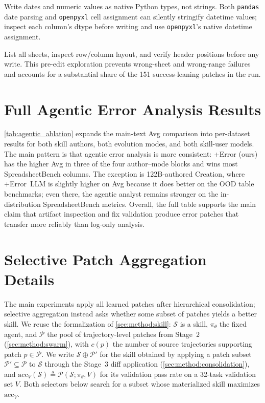 Write dates and numeric values as native Python types, not strings.
Both \texttt{pandas} date parsing and \texttt{openpyxl} cell assignment can silently stringify datetime values; inspect each column's dtype before writing and use \texttt{openpyxl}'s native datetime assignment.

List all sheets, inspect row/column layout, and verify header positions before any write.
This pre-edit exploration prevents wrong-sheet and wrong-range failures and accounts for a substantial share of the 151 success-leaning patches in the run.

\section{Full Agentic Error Analysis Results}
\label{app:agentic_ablation_full}

\cref{tab:agentic_ablation} expands the main-text Avg comparison into per-dataset results for both skill authors, both evolution modes, and both skill-user models.
The main pattern is that agentic error analysis is more consistent: +Error (ours) has the higher Avg in three of the four author--mode blocks and wins most SpreadsheetBench columns.
The exception is 122B-authored Creation, where +Error~LLM is slightly higher on Avg because it does better on the OOD table benchmarks; even there, the agentic analyst remains stronger on the in-distribution SpreadsheetBench metrics.
Overall, the full table supports the main claim that artifact inspection and fix validation produce error patches that transfer more reliably than log-only analysis.

\begin{table}[t]

\end{table}

\section{Selective Patch Aggregation Details}
\label{app:selective_patch_aggregation}

The main experiments apply all learned patches after hierarchical consolidation; selective aggregation instead asks whether some subset of patches yields a better skill.
We reuse the formalization of \cref{sec:method:skill}: $\mathcal{S}$ is a skill, $\pi_\theta$ the fixed agent, and $\mathcal{P}$ the pool of trajectory-level patches from Stage~2 (\cref{sec:method:swarm}), with $c(p)$ the number of source trajectories supporting patch $p\in\mathcal{P}$.
We write $\mathcal{S}\oplus\mathcal{P}'$ for the skill obtained by applying a patch subset $\mathcal{P}'\subseteq\mathcal{P}$ to $\mathcal{S}$ through the Stage~3 diff application (\cref{sec:method:consolidation}), and $\mathrm{acc}_V(\mathcal{S})\triangleq\mathcal{P}(\mathcal{S};\pi_\theta,V)$ for its validation pass rate on a 32-task validation set $V$.
Both selectors below search for a subset whose materialized skill maximizes $\mathrm{acc}_V$.


